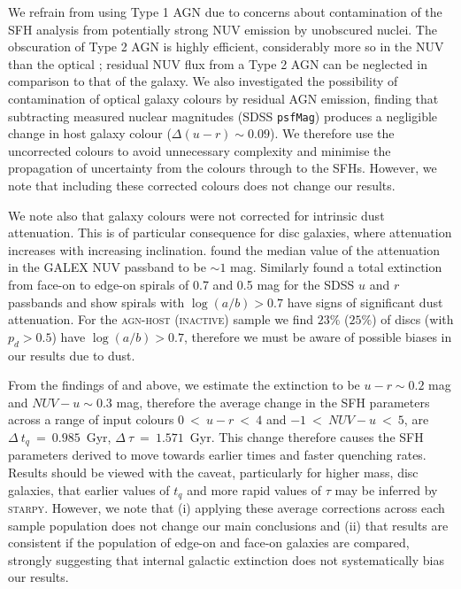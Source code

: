 \documentclass[useAMS,usenatbib]{mn2e}
\def\changed    {\color{nc} }
\def\secondchange    {\color{srv} }
\def\newref    {\color{new} }
\begin{document}
{\changed We refrain from using Type 1 AGN due to concerns about contamination of the SFH analysis from potentially strong NUV emission by unobscured nuclei. The obscuration of Type 2 AGN is highly efficient, considerably more so in the NUV than the optical \citep{Simmons11}; residual NUV flux from a Type 2 AGN can be neglected in comparison to that of the galaxy. We also investigated the possibility of contamination of optical galaxy colours by residual AGN emission, finding that subtracting measured nuclear magnitudes (SDSS {\tt psfMag}) produces a negligible change in host galaxy colour ($\Delta(u-r) \sim 0.09$)}. We therefore use the uncorrected colours to avoid unnecessary complexity and minimise the propagation of uncertainty from the colours through to the SFHs. {\changed However, we note that including these corrected colours does not change our results.}  

{\secondchange We note also that galaxy colours were not corrected for intrinsic dust attenuation. This is of particular consequence for disc galaxies, where attenuation increases with increasing inclination. \cite{Buat05} found the median value of the attenuation in the GALEX NUV passband to be $\sim 1$ mag. Similarly \cite{Masters10} found a total extinction from face-on to edge-on spirals of 0.7 and 0.5 mag for the SDSS $u$ and $r$ passbands and show spirals with $\log(a/b) > 0.7$ have signs of significant dust attenuation. For the \textsc{agn-host} (\textsc{inactive}) sample we find $23\%$ ($25\%$) of discs (with $p_d > 0.5$) have $\log(a/b) > 0.7$, therefore we must be aware of possible biases in our results due to dust. 

From the findings of \cite{Masters10} and \cite{Buat05} above, we estimate the extinction to be $u-r \sim 0.2$ mag and $NUV-u \sim 0.3$ mag, therefore the average change in the SFH parameters across a range of input colours $0 ~<~u-r~<~4$ and $-1~<~NUV-u~<~5$,  are $\Delta~t_q~=~0.985$~Gyr, $\Delta~\tau~=~1.571$~Gyr. This change therefore causes the SFH parameters derived to move towards earlier times and faster quenching rates. Results should be viewed with the caveat, particularly for higher mass, disc galaxies, that earlier values of $t_q$ and more rapid values of $\tau$ may be inferred by \textsc{starpy}. However, we note that (i) applying these average corrections across each sample population does not change our main conclusions and {\newref (ii) that results are consistent if the population of edge-on and face-on galaxies are compared, strongly suggesting that internal galactic extinction does not systematically bias our results.}}
\end{document}
